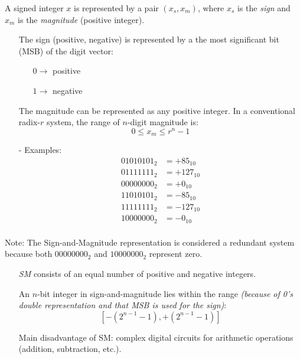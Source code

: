 \documentclass[12pt,openany, tikz,border=10pt]{book}
\begin{document}
	A signed integer \( x \) is represented by a pair \( (x_s, x_m) \), where \( x_s \) is the \textit{sign} and \( x_m \) is the \textit{magnitude} (positive integer).
	
	\begin{itemize}
		\item[] The sign (positive, negative) is represented by a the most significant bit (MSB) of the digit vector:
		      \begin{itemize}
		      	\item[] \( 0 \rightarrow \) positive
		      	\item[] \( 1 \rightarrow \) negative
		      \end{itemize}
		\item[] The magnitude can be represented as any positive integer. In a conventional radix-\( r \) system, the range of \( n \)-digit magnitude is:
		      \[ 0 \leq x_m \leq r^n - 1 \]
	\end{itemize}
	
	\begin{itemize}
		\item[-] Examples:
		      \begin{align*}
		      	01010101_2 & = +85_{10}  \\
		      	01111111_2 & = +127_{10} \\
		      	00000000_2 & = +0_{10}   \\
		      	11010101_2 & = -85_{10}  \\
		      	11111111_2 & = -127_{10} \\
		      	10000000_2 & = -0_{10}   \\
		      \end{align*}
	\end{itemize}
	\newpage
	Note: The Sign-and-Magnitude representation is considered a redundant system because both \( 00000000_2 \) and \( 10000000_2 \) represent zero.
	
	\begin{itemize}
		\item[] \textit{SM} consists of an equal number of positive and negative integers.
		\item[] An \( n \)-bit integer in sign-and-magnitude lies within the range \textit{(because of 0's double representation and that MSB is used for the sign)}: 
		      $$ [-\left(2^{n-1} - 1\right), +\left(2^{n-1} - 1\right)] $$ 
		\item[] Main disadvantage of SM: complex digital circuits for arithmetic operations (addition, subtraction, etc.).
	\end{itemize}
	
\end{document}

